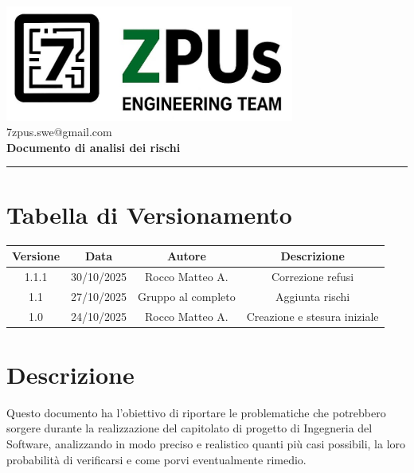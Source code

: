 \documentclass[a4paper,12pt]{article}
\begin{document}
\begin{center}
    \includegraphics[width=9.5cm]{../assets/logo7ZPUS.jpg}\\
    \small\hspace{10cm} 7zpus.swe@gmail.com\\
    \Large \textbf{Documento di analisi dei rischi}\\
    \vspace{0.5cm}
\end{center}

\vspace{0.3cm}
\hrule
\vspace{0.3cm}

\tableofcontents

\newpage

\section*{Tabella di Versionamento}
    \begin{tabular}{|c|c|c|c|}
        \hline
        \textbf{Versione} & \textbf{Data} & \textbf{Autore} & \textbf{Descrizione} \\
        \hline
        1.1.1 & 30/10/2025 & Rocco Matteo A. & Correzione refusi \\
        \hline
        1.1 & 27/10/2025 & Gruppo al completo & Aggiunta rischi \\
        \hline
        1.0 & 24/10/2025 & Rocco Matteo A. & Creazione e stesura iniziale \\
        \hline
    \end{tabular}

\section{Descrizione}
Questo documento ha l'obiettivo di riportare le problematiche che potrebbero sorgere durante la realizzazione del capitolato di progetto di Ingegneria del Software, analizzando in modo preciso e realistico quanti più casi possibili, la loro probabilità di verificarsi e come porvi eventualmente rimedio.
\end{document}
